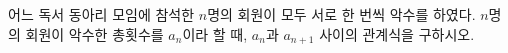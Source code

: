 어느 독서 동아리 모임에 참석한 $n$명의 회원이 모두 서로 한 번씩 악수를 하였다. $n$명의 회원이 악수한 총횟수를 $a_n$이라 할 때, $a_n$과 $a_{n+1}$ 사이의 관계식을 구하시오.
